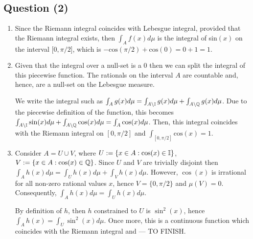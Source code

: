 \documentclass{article}
\begin{document}
\begin{center}
\section*{Question (2)}
\end{center}


\begin{enumerate}[label=(\roman*)]
    \item Since the Riemann integral coincides with Lebesgue integral, provided that the Riemann integral exists, then $\int_A f(x) d\mu$ is the integral of sin$(x)$ on the interval [$0, \pi/2$], which is $-\text{cos}(\pi/2) + \text{cos}(0) = 0 + 1 = 1$. 
    \item Given that the integral over a null-set is a 0 then we can split the integral of this piecewise function. The rationals on the interval $A$ are countable and, hence, are a null-set on the Lebesgue measure. \newline

    We write the integral such as $\int_A g(x) d\mu = \int_{A \setminus \mathbb{I}} g(x) d\mu + \int_{A \setminus \mathbb{Q}} g(x) d\mu$. Due to the piecewise definition of the function, this becomes $\int_{A \setminus \mathbb{I}} \sin(x) d\mu + \int_{A \setminus \mathbb{Q}} \cos(x) d\mu = \int_{A} \cos(x) d\mu$. Then, this integral coincides with the Riemann integral on $[0, \pi/2]$ and $\int_{[0, \pi/2]} \text{cos}(x) = 1$.


    \item Consider $A = U \cup V$, where $U := \{ x \in A : \cos(x) \in \mathbb{I} \}$, $V := \{ x \in A : \cos(x) \in \mathbb{Q} \}$. Since $U$ and $V$ are trivially disjoint then $\int_A h(x) d\mu = \int_U h(x) d\mu + \int_V h(x) d\mu$. However, $\cos(x)$ is irrational for all non-zero rational values $x$, hence $V = \{ 0, \pi/2 \}$ and $\mu(V) = 0$. Consequently, $\int_A h(x) d\mu = \int_U h(x) d\mu$. \newline 

    By definition of $h$, then $h$ constrained to $U$ is $\sin^2(x)$, hence $\int_A h(x) = \int_U \sin^2(x) d\mu$. Once more, this is a continuous function which coincides with the Riemann integral and --- TO FINISH.
\end{enumerate}
\end{document}
